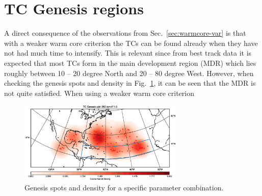 \section{TC Genesis regions}
A direct consequence of the observations from Sec.~\ref{sec:warmcore-var} is that with a weaker warm core criterion the TCs can be found already when they have not had much time to intensify. This is relevant since from best track data it is expected that most TCs form in the main development region (MDR) which lies roughly between 10 -- 20 degree North and 20 -- 80 degree West. However, when checking the genesis spots and density in Fig.~\ref{fig:genesis-temdif1}, it can be seen that the MDR is not quite satisfied. When using a weaker warm core criterion 
\begin{figure}[ht]
	\centering
	\includegraphics[width=0.7\textwidth]{img/genesis_plot_temdif1.eps}
	\caption{Genesis spots and density for a specific parameter combination.}
	\label{fig:genesis-temdif1}
\end{figure}



